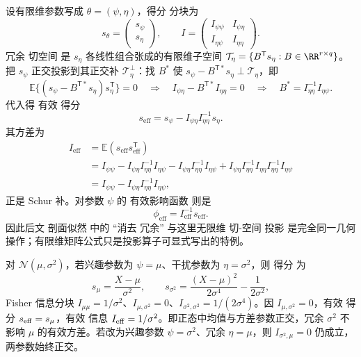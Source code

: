 \begin{workedexample}
设有限维参数写成 $\theta=(\psi,\eta)$，得分 分块为
\[
 s_\theta=
 \begin{pmatrix}
 s_\psi\\ s_\eta
 \end{pmatrix},
 \qquad
 I=
 \begin{pmatrix}
 I_{\psi\psi}&I_{\psi\eta}\\
 I_{\eta\psi}&I_{\eta\eta}
 \end{pmatrix}.
\]
冗余 切空间 是 $s_\eta$ 各线性组合张成的有限维子空间 $\mathcal T_\eta=\{B^{\mathsf T}s_\eta:B\in\RR^{r\times q}\}$。把 $s_\psi$ 正交投影到其正交补 $\mathcal T_\eta^\perp$：找 $B^*$ 使 $s_\psi-B^{{\mathsf T}*}s_\eta\perp\mathcal T_\eta$，即
\[
\mathbb E\{(s_\psi-B^{{\mathsf T}*}s_\eta)s_\eta^{\mathsf T}\}=0
\quad\Longrightarrow\quad
I_{\psi\eta}-B^{{\mathsf T}*}I_{\eta\eta}=0
\quad\Longrightarrow\quad
B^*=I_{\eta\eta}^{-1}I_{\eta\psi}.
\]
代入得 有效 得分
\[
 s_{\mathrm{eff}}
 =s_\psi-
 I_{\psi\eta}I_{\eta\eta}^{-1}s_\eta.
\]
其方差为
\[
 \begin{aligned}
 I_{\mathrm{eff}}
 &=\mathbb E(s_{\mathrm{eff}}s_{\mathrm{eff}}^{\mathsf T})\\
 &=I_{\psi\psi}
 -I_{\psi\eta}I_{\eta\eta}^{-1}I_{\eta\psi}
 -I_{\psi\eta}I_{\eta\eta}^{-1}I_{\eta\psi}
 +I_{\psi\eta}I_{\eta\eta}^{-1}I_{\eta\eta}I_{\eta\eta}^{-1}I_{\eta\psi}\\
 &=I_{\psi\psi}
 -I_{\psi\eta}I_{\eta\eta}^{-1}I_{\eta\psi},
 \end{aligned}
\]
正是 Schur 补。对参数 $\psi$ 的 有效影响函数 则是
\[
 \phi_{\mathrm{eff}}
 =I_{\mathrm{eff}}^{-1}s_{\mathrm{eff}}.
\]
因此后文 剖面似然 中的 ``消去 冗余'' 与这里无限维 切-空间 投影 是完全同一几何操作；有限维矩阵公式只是投影算子可显式写出的特例。
\end{workedexample}

\begin{workedexample}[正态均值与方差参数的正交性]
对 $\mathcal N(\mu,\sigma^2)$，若兴趣参数为 $\psi=\mu$、干扰参数为 $\eta=\sigma^2$，则 得分 为
\[
s_\mu=\frac{X-\mu}{\sigma^2},
\qquad
s_{\sigma^2}=\frac{(X-\mu)^2}{2\sigma^4}-\frac1{2\sigma^2},
\]
Fisher 信息分块 $I_{\mu\mu}=1/\sigma^2$、$I_{\mu,\sigma^2}=0$、$I_{\sigma^2,\sigma^2}=1/(2\sigma^4)$。因 $I_{\mu,\sigma^2}=0$，有效 得分 $s_{\rm eff}=s_\mu$，有效 信息 $I_{\rm eff}=1/\sigma^2$。即正态中均值与方差参数正交，冗余 $\sigma^2$ 不影响 $\mu$ 的有效方差。若改为兴趣参数 $\psi=\sigma^2$、冗余 $\eta=\mu$，则 $I_{\sigma^2,\mu}=0$ 仍成立，两参数始终正交。
\end{workedexample}

